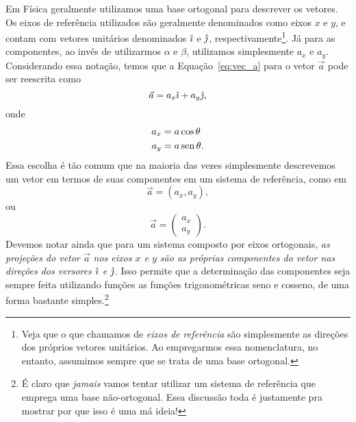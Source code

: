 Em Física geralmente utilizamos uma base ortogonal para descrever os vetores. Os eixos de referência utilizados são geralmente denominados como eixos $x$ e $y$, e contam com vetores unitários denominados $\hat{\imath}$ e $\hat{\jmath}$, respectivamente\footnote{Veja que o que chamamos de \emph{eixos de referência} são simplesmente as direções dos próprios vetores unitários. Ao empregarmos essa nomenclatura, no entanto, assumimos sempre que se trata de uma base ortogonal.}. Já para as componentes, ao invés de utilizarmos $\alpha$ e $\beta$, utilizamos simplesmente $a_x$ e $a_y$. Considerando essa notação, temos que a Equação~\eqref{eq:vec_a} para o vetor $\vec{a}$ pode ser reescrita como
\begin{equation}
    \vec{a} = a_x \hat{\imath} + a_y \hat{\jmath},
\end{equation}
%
onde
\begin{align}
    a_x &= a\cos\theta \label{Eq:CompX}\\
    a_y &= a\operatorname{sen}\theta. \label{Eq:CompY}
\end{align}
%
Essa escolha é tão comum que na maioria das vezes simplesmente descrevemos um vetor em termos de suas componentes em um sistema de referência, como em
\begin{equation}
    \vec{a} = (a_x,a_y),
\end{equation}
ou
\begin{equation}
  \vec{a} = \begin{pmatrix} a_x \\ a_y \end{pmatrix}.
\end{equation}
%
Devemos notar ainda que para um sistema composto por eixos ortogonais, \emph{as projeções do vetor $\vec{a}$ nos eixos $x$ e $y$ são as próprias componentes do vetor nas direções dos versores $\hat{\imath}$ e $\hat{\jmath}$}. Isso permite que a determinação das componentes seja sempre feita utilizando funções as funções trigonométricas seno e cosseno, de uma forma bastante simples.\footnote[][-5cm]{É claro que \emph{jamais} vamos tentar utilizar um sistema de referência que emprega uma base não-ortogonal. Essa discussão toda é justamente pra mostrar por que isso é uma má ideia!}

